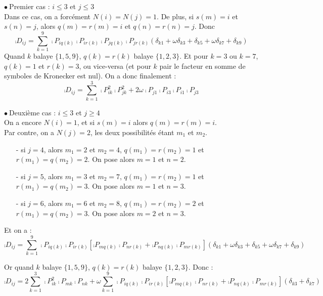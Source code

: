 \vspace{1cm}
$\bullet\ ${\sc Premier cas} : $i\leqslant 3$ et $j\leqslant 3$\\
Dans ce cas, on a forc\'ement $N(i)=N(j)=1$. De plus, si $s(m)=i$ et $s(n)=j$,
alors $q(m)=r(m)=i$ et $q(n)=r(n)=j$. Donc \\
\begin{equation}
\comp{D}_{ij}=\sum_{k=1}^9
\comp{P}_{iq(k)}\comp{P}_{ir(k)}\comp{P}_{jq(k)}\comp{P}_{jr(k)}
(\delta_{k1}+\omega\delta_{k3}+\delta_{k5}+\omega\delta_{k7}+\delta_{k9})
\end{equation}
Quand $k$ balaye $\{1,5,9\}$, $q(k)=r(k)$ balaye $\{1,2,3\}$. Et pour $k=3$ ou
$k=7$, $q(k)=1$ et $r(k)=3$, ou vice-versa (et pour $k$ pair le facteur en somme
de symboles de Kronecker est nul). On a donc finalement :
\begin{equation}
\comp{D}_{ij}=\sum_{k=1}^3\comp{P}_{ik}^2\comp{P}_{jk}^2
+2\omega\comp{P}_{j1}\comp{P}_{i3}\comp{P}_{i1}\comp{P}_{j3}
\end{equation}

\vspace{1cm}
$\bullet\ ${\sc Deuxi\`eme cas} : $i\leqslant 3$ et $j\geqslant 4$\\
On a encore $N(i)=1$, et si $s(m)=i$ alors $q(m)=r(m)=i$.\\
Par contre, on a $N(j)=2$, les deux possibilit\'es \'etant $m_1$ et $m_2$.\\
\begin{itemize}
\item[-] si $j=4$, alors $m_1=2$ et $m_2=4$,
$q(m_1)=r(m_2)=1$ et $r(m_1)=q(m_2)=2$. On pose alors
$m=1$ et $n=2$.

\item[-] si $j=5$, alors $m_1=3$ et $m_2=7$,
$q(m_1)=r(m_2)=1$ et $r(m_1)=q(m_2)=3$. On pose alors
$m=1$ et $n=3$.

\item[-] si $j=6$, alors $m_1=6$ et $m_2=8$,
$q(m_1)=r(m_2)=2$ et $r(m_1)=q(m_2)=3$. On pose alors
$m=2$ et $n=3$.
\end{itemize}

Et on a :
\begin{equation}
\comp{D}_{ij}=\sum_{k=1}^9
\comp{P}_{iq(k)}\comp{P}_{ir(k)}\left[
\comp{P}_{mq(k)}\comp{P}_{nr(k)}+\comp{P}_{nq(k)}\comp{P}_{mr(k)}\right]
(\delta_{k1}+\omega\delta_{k3}+\delta_{k5}+\omega\delta_{k7}+\delta_{k9})
\end{equation}

Or quand $k$ balaye $\{1,5,9\}$, $q(k)=r(k)$ balaye $\{1,2,3\}$. Donc :
\begin{equation}
\comp{D}_{ij}=2\sum_{k=1}^3
\comp{P}_{ik}^2\comp{P}_{mk}\comp{P}_{nk}
+\omega\sum_{k=1}^9
\comp{P}_{iq(k)}\comp{P}_{ir(k)}\left[
\comp{P}_{mq(k)}\comp{P}_{nr(k)}+\comp{P}_{nq(k)}\comp{P}_{mr(k)}\right]
(\delta_{k3}+\delta_{k7})
\end{equation}

